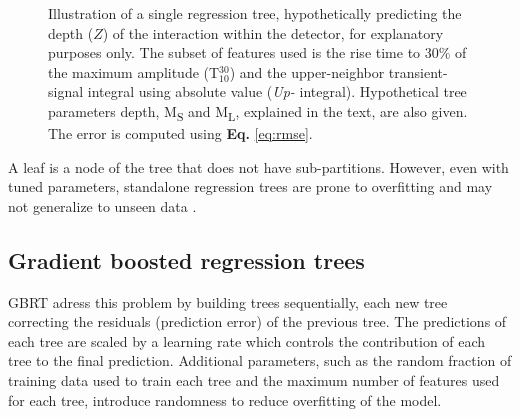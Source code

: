 \begin{figure}
\centering
{}
\caption{Illustration of a single regression tree, hypothetically predicting the depth ($Z$) of the interaction within the detector, for explanatory purposes only. The subset of features used is the rise time to 30\% of the maximum amplitude (T$_{10}^{30}$) and the upper-neighbor transient-signal integral using absolute value (\textit{Up-} integral). Hypothetical tree parameters depth, M\textsubscript{S} and M\textsubscript{L}, explained in the text, are also given. The error is computed using \textbf{Eq.} \ref{eq:rmse}.}
\label{fig:regression_tree}
\end{figure}

A leaf is a node of the tree that does not have sub-partitions. However, even with tuned parameters, standalone regression trees are prone to overfitting and may not generalize to unseen data \cite{hastie01statisticallearning}.

\subsection{Gradient boosted regression trees}

GBRT adress this problem by building trees sequentially, each new tree correcting the residuals (prediction error) of the previous tree. The predictions of each tree are scaled by a learning rate which controls the contribution of each tree to the final prediction. Additional parameters, such as the random fraction of training data used to train each tree and the maximum number of features used for each tree, introduce randomness to reduce overfitting of the model.

